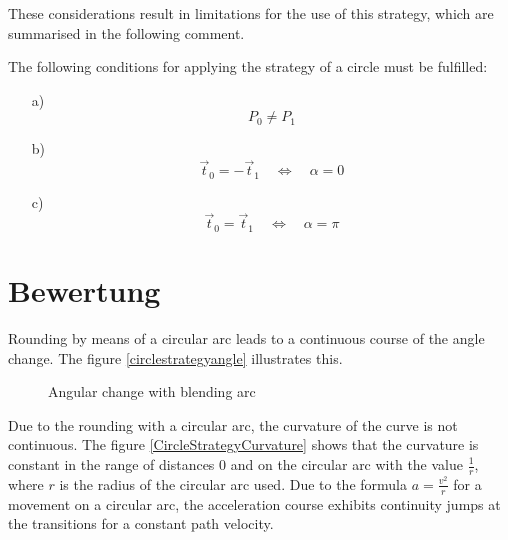 
\bigskip

These considerations result in limitations for the use of this strategy, which are summarised in the following comment.


\bigskip



\Bemerkung
{
  The following conditions for applying the strategy of a circle must be fulfilled:

  \begin{itemize}
    \item [a)] $$P_0 \neq P_1$$
    \item [b)] $$ \vec{t}_0 = -\vec{t}_1\quad \Leftrightarrow \quad \alpha = 0$$
    \item [c)] $$ \vec{t}_0 =  \vec{t}_1\quad \Leftrightarrow \quad \alpha = \pi$$
  \end{itemize}
}


\section{Bewertung}

Rounding by means of a circular arc leads to a continuous course of the angle change. The figure \ref{circlestrategyangle} illustrates this.

\bigskip

\begin{figure}
  \begin{center}
  \end{center}
  \caption{Angular change with blending arc}\label{KreisstrategieWinkel}
\end{figure}

\bigskip

Due to the rounding with a circular arc, the curvature of the curve is not continuous. The figure \ref{CircleStrategyCurvature} shows that the curvature is constant in the range of distances $0$ and on the circular arc with the value $\frac{1}{r}$, where $r$ is the radius of the circular arc used. Due to the formula $a=\frac{v^2}{r}$ for a movement on a circular arc, the acceleration course exhibits continuity jumps at the transitions for a constant path velocity.


